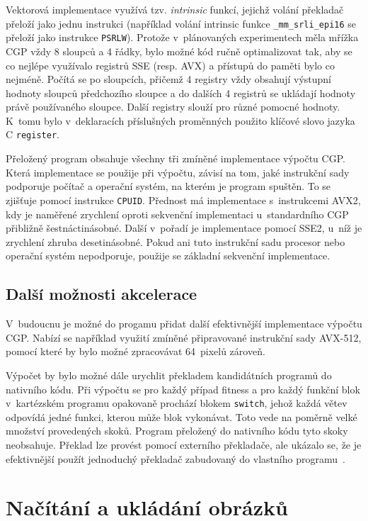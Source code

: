 Vektorová implementace využívá tzv. \emph{intrinsic} funkcí, jejichž volání překladač přeloží jako jednu instrukci (například volání intrinsic funkce \texttt{\_mm\_srli\_epi16} se přeloží jako instrukce \texttt{PSRLW}). Protože v~plánovaných experimentech měla mřížka CGP vždy 8 sloupců a 4 řádky, bylo možné kód ručně optimalizovat tak, aby se co nejlépe využívalo registrů SSE (resp. AVX) a přístupů do paměti bylo co nejméně. Počítá se po sloupcích, přičemž 4 registry vždy obsahují výstupní hodnoty sloupců předchozího sloupce a do dalších 4 registrů se ukládají hodnoty právě používaného sloupce. Další registry slouží pro různé pomocné hodnoty. K~tomu bylo v~deklaracích příslušných proměnných použito klíčové slovo jazyka C \texttt{register}.

Přeložený program obsahuje všechny tři zmíněné implementace výpočtu CGP. Která implementace se použije při výpočtu, závisí na tom, jaké instrukční sady podporuje počítač a operační systém, na kterém je program spuštěn. To se zjišťuje pomocí instrukce \texttt{CPUID}. Přednost má implementace s~instrukcemi AVX2, kdy je naměřené zrychlení oproti sekvenční implementaci u~standardního CGP přibližně šestnáctinásobné. Další v~pořadí je implementace pomocí SSE2, u~níž je zrychlení zhruba desetinásobné. Pokud ani tuto instrukční sadu procesor nebo operační systém nepodporuje, použije se základní sekvenční implementace.

\subsection{Další možnosti akcelerace}

V~budoucnu je možné do progamu přidat další efektivnější implementace výpočtu CGP. Nabízí se například využití zmíněné připravované instrukční sady AVX-512, pomocí které by bylo možné zpracovávat 64~pixelů zároveň.

Výpočet by bylo možné dále urychlit překladem kandidátních programů do nativního kódu. Při výpočtu se pro každý případ fitness a pro každý funkční blok v~kartézském programu opakovaně prochází blokem \texttt{switch}, jehož každá větev odpovídá jedné funkci, kterou může blok vykonávat. Toto vede na poměrně velké množství provedených skoků. Program přeložený do nativního kódu tyto skoky neobsahuje. Překlad lze provést pomocí externího překladače, ale ukázalo se, že je efektivnější použít jednoduchý překladač zabudovaný do vlastního programu~\cite{VasicekCompiler}.

\section{Načítání a ukládání obrázků}
\label{secImplImages}

